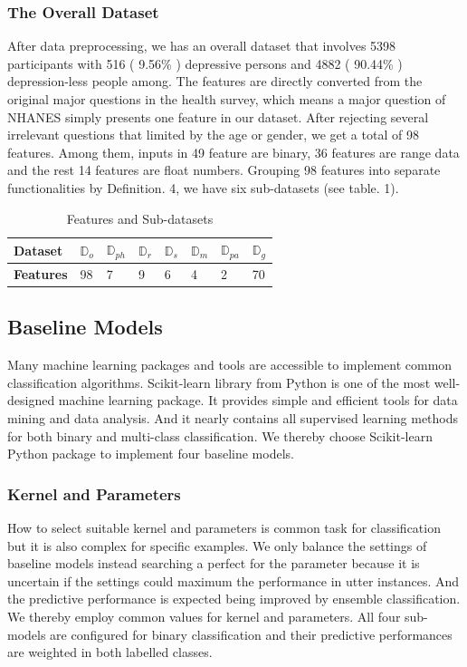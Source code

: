 \documentclass[10pt,journal,compsoc]{IEEEtran}
\begin{document}
\subsubsection{The Overall Dataset}
After data preprocessing, we has an overall dataset that involves 5398 participants with 516 ( 9.56\% ) depressive persons and 4882 ( 90.44\% ) depression-less people among. The features are directly converted from the original major questions in the health survey, which means a major question of NHANES simply presents one feature in our dataset. After rejecting several irrelevant questions that limited by the age or gender, we get a total of 98 features. Among them, inputs in 49 feature are binary, 36 features are range data and the rest 14 features are float numbers. Grouping 98 features into separate functionalities by Definition. 4, we have six sub-datasets (see table. 1).
\begin{table}[ht]
\centering
\begin{tabular}{|C{1.2cm}|C{0.6cm}|C{0.6cm}|C{0.6cm}|C{0.6cm}|C{0.6cm}|C{0.6cm}|C{0.6cm}|}
\hline
{} 
{\color[HTML]{000000} \textbf{Dataset}} & {\color[HTML]{000000} \textbf{$\mathbb{D}_{o}$}} & {\color[HTML]{000000} \textbf{$\mathbb{D}_{ph}$}} & {\color[HTML]{000000} \textbf{$\mathbb{D}_{r}$}} & {\color[HTML]{000000} \textbf{$\mathbb{D}_{s}$}} & {\color[HTML]{000000} \textbf{$\mathbb{D}_{m}$}} & {\color[HTML]{000000} \textbf{$\mathbb{D}_{pa}$}} & {\color[HTML]{000000} \textbf{$\mathbb{D}_{g}$}} \\ \hline
{} 
\textbf{Features}& 98 & 7 & 9 & 6 & 4 & 2 & 70 \\ \hline
\end{tabular}
\caption{Features and Sub-datasets}
\label{weight}
\end{table} 
%
%
\subsection{Baseline Models}
Many machine learning packages and tools are accessible to implement common classification algorithms. Scikit-learn library from Python is one of the most well-designed machine learning package. It provides simple and efficient tools for data mining and data analysis. And it nearly contains all supervised learning methods for both binary and multi-class classification. We thereby choose Scikit-learn Python package to implement four baseline models.
%
%
\subsubsection{Kernel and Parameters}
How to select suitable kernel and parameters is common task for classification but it is also complex for specific examples. We only balance the settings of baseline models instead searching a perfect for the parameter because it is uncertain if the settings could maximum the performance in utter instances. And the predictive performance is expected being improved by ensemble classification. We thereby employ common values for kernel and parameters. All four sub-models are configured for binary classification and their predictive performances are weighted in both labelled classes. 
%
%
\end{document}
